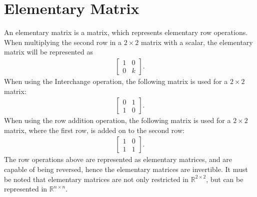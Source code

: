\chapter{Elementary Matrix}\label{bil:ElementaryMatrix}
An elementary matrix is a matrix, which represents elementary row operations. When multiplying the second row in a $2 \times 2$ matrix with a scalar, the elementary matrix will be represented as 
\begin{align*}
    \begin{bmatrix}
    1 & 0\\
    0 & k
    \end{bmatrix}.
\end{align*}
When using the Interchange operation, the following matrix is used for a $2\times 2$ matrix:
\begin{align*}
    \begin{bmatrix}
    0 & 1\\
    1 & 0
    \end{bmatrix}.
\end{align*}
When using the row addition operation, the following matrix is used for a $2\times 2$ matrix, where the first row, is added on to the second row:
\begin{align*}
    \begin{bmatrix}
        1 & 0\\
        1 & 1
    \end{bmatrix}.
\end{align*}
The row operations above are represented as elementary matrices, and are capable of being reversed, hence the elementary matrices are invertible. It must be noted that elementary matrices are not only restricted in $\mathbb{R}^{2\times 2}$, but can be represented in $\mathbb{R}^{n\times n}$.\\

